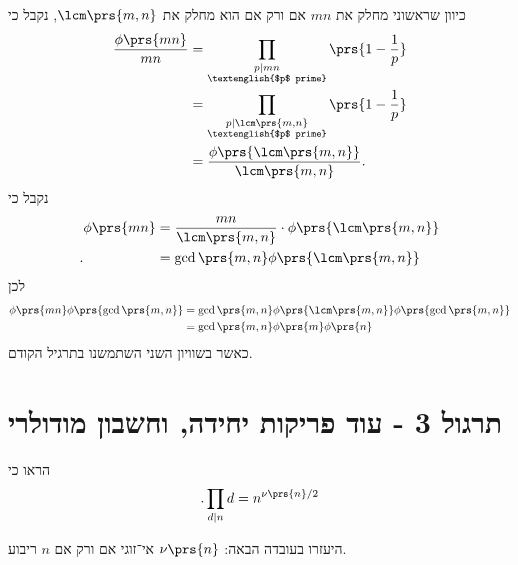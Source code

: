 \documentclass[a4paper,10pt,twoside,openany]{book}
\begin{document}
\begin{solution}
כיוון שראשוני מחלק את
$mn$
אם ורק אם הוא מחלק את
$\lcm\prs{m,n}$,
נקבל כי
\begin{align*}
\frac{\phi\prs{mn}}{mn} &= \prod_{\substack{p \mid mn \\ \text{\textenglish{$p$ prime}}}} \prs{1 - \frac{1}{p}}
\\&=
\prod_{\substack{p \mid \lcm\prs{m,n} \\ \text{\textenglish{$p$ prime}}}} \prs{1 - \frac{1}{p}}
\\&=
\frac{\phi\prs{\lcm\prs{m,n}}}{\lcm\prs{m,n}} \text{.}
\end{align*}
נקבל כי
\begin{align*}
\phi\prs{mn} &= \frac{mn}{\lcm\prs{m,n}} \cdot \phi\prs{\lcm\prs{m,n}}
\\ \text{.}\hphantom{\phi\prs{mn}} &= \gcd\prs{m,n} \phi\prs{\lcm\prs{m,n}}
\end{align*}
לכן
\begin{align*}
\phi\prs{mn} \phi\prs{\gcd\prs{m,n}} &= \gcd\prs{m,n} \phi\prs{\lcm\prs{m,n}} \phi\prs{\gcd\prs{m,n}}
\\&= \gcd\prs{m,n} \phi\prs{m} \phi\prs{n}
\end{align*}
כאשר בשוויון השני השתמשנו בתרגיל הקודם.
\end{solution}

\chapter{תרגול 3 - עוד פריקות יחידה, וחשבון מודולרי}

\begin{exercisechap}
הראו כי
\[\text{.} \prod_{d \mid n} d = n^{\nu\prs{n} / 2}\]

היעזרו בעובדה הבאה:
$\nu\prs{n}$
אי־זוגי אם ורק אם
$n$
ריבוע.
\end{exercisechap}
\end{document}
